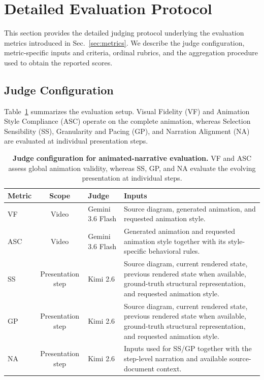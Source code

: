 \documentclass{article} %
\begin{document}
\section{Detailed Evaluation Protocol}
\label{sec:supp_eval}

This section provides the detailed judging protocol underlying the evaluation
metrics introduced in Sec.~\ref{sec:metrics}. We describe the judge
configuration, metric-specific inputs and criteria, ordinal rubrics, and the
aggregation procedure used to obtain the reported scores.

\subsection{Judge Configuration}
\label{sec:supp_eval_setup}

Table~\ref{tab:supp_judge_setup} summarizes the evaluation setup. Visual
Fidelity (VF) and Animation Style Compliance (ASC) operate on the complete
animation, whereas Selection Sensibility (SS), Granularity and Pacing (GP),
and Narration Alignment (NA) are evaluated at individual presentation steps.

\begin{table}[t]
\centering
\small
\setlength{\tabcolsep}{5pt}
\begin{tabular}{lclp{9.1cm}}
\toprule
\textbf{Metric} & \textbf{Scope} & \textbf{Judge} & \textbf{Inputs} \\
\midrule
VF
& Video
& Gemini 3.6 Flash
& Source diagram, generated animation, and requested animation style. \\

ASC
& Video
& Gemini 3.6 Flash
& Generated animation and requested animation style together with its
style-specific behavioral rules. \\

SS
& Presentation step
& Kimi 2.6
& Source diagram, current rendered state, previous rendered state when
available, ground-truth structural representation, and requested animation
style. \\

GP
& Presentation step
& Kimi 2.6
& Source diagram, current rendered state, previous rendered state when
available, ground-truth structural representation, and requested animation
style. \\

NA
& Presentation step
& Kimi 2.6
& Inputs used for SS/GP together with the step-level narration and available
source-document context. \\
\bottomrule
\end{tabular}
\caption{\textbf{Judge configuration for animated-narrative evaluation.}
VF and ASC assess global animation validity, whereas SS, GP, and NA evaluate
the evolving presentation at individual steps.}
\label{tab:supp_judge_setup}
\end{table}
\end{document}
